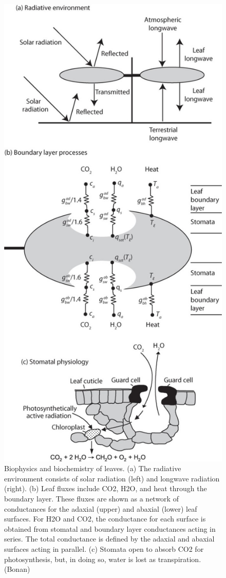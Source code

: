 \documentclass[
  oneside]{book}
\begin{document}
\begin{figure}

{\centering \includegraphics[width=0.8\linewidth]{figures/chap3/f331_leaf_E_balance} 

}

\caption{Biophysics and biochemistry of leaves. (a) The radiative environment consists of solar radiation (left) and longwave radiation (right). (b) Leaf fluxes include CO2, H2O, and heat through the boundary layer. These fluxes are shown as a network of conductances for the adaxial (upper) and abaxial (lower) leaf surfaces. For H2O and CO2, the conductance for each surface is obtained from stomatal and boundary layer conductances acting in series. The total conductance is defined by the adaxial and abaxial surfaces acting in parallel. (c) Stomata open to absorb CO2 for photosynthesis, but, in doing so, water is lost as transpiration. (Bonan)}\label{fig:f331}
\end{figure}
\end{document}
